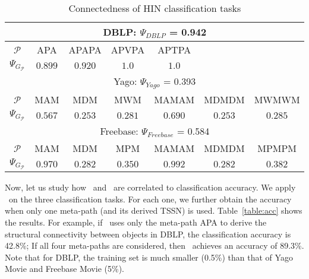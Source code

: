 \begin{table}
\caption{Connectedness of HIN classification tasks}
\centering
\tiny
\begin{tabular}{|c|c|c|c|c|c|c|}  \hline
\multicolumn{7}{|c|}{DBLP: $\Psi_{\mathit{DBLP}}$ = 0.942} \\ \hline
$\mathcal{P}$ & APA & APAPA & APVPA & APTPA  & & \\ \hline
$\Psi_{G_\mathcal{P}}$ & $0.899$ & $0.920$ & $1.0$ & $1.0$ & & \\ \hline \hline
\multicolumn{7}{|c|}{Yago: $\Psi_{\mathit{Yago}}$ = 0.393} \\ \hline
$\mathcal{P}$ & MAM & MDM & MWM & MAMAM  & MDMDM & MWMWM  \\ \hline
$\Psi_{G_\mathcal{P}}$ & $0.567$ & $0.253$ & $0.281$ & $0.690$ & $0.253$ & $0.285$  \\ \hline \hline
\multicolumn{7}{|c|}{Freebase: $\Psi_{\mathit{Freebase}}$ = 0.584 } \\ \hline
$\mathcal{P}$ & MAM & MDM & MPM & MAMAM & MDMDM & MPMPM \\ \hline
$\Psi_{G_\mathcal{P}}$ & $0.970$ & $0.282$ & $0.350$ & $0.992$ & $0.282$ & $0.382$ \\ \hline
\end{tabular}
\label{table:cnn}
\end{table}

Now, let us study how \chn\ and \cnn\ 
are correlated to classification accuracy. We apply \gm\ on the three classification tasks.
For each one,
we further obtain the accuracy when only one meta-path (and its derived TSSN) is used.
Table~\ref{table:acc} shows the results.
For example,  if \gm\ uses only the meta-path APA to derive 
the structural connectivity between objects in DBLP, the classification accuracy is 42.8\%;
If all four meta-paths are considered, then \gm\ achieves an accuracy of 89.3\%.
Note that for DBLP, the training set is much smaller (0.5\%) than that of Yago Movie and Freebase Movie (5\%).

